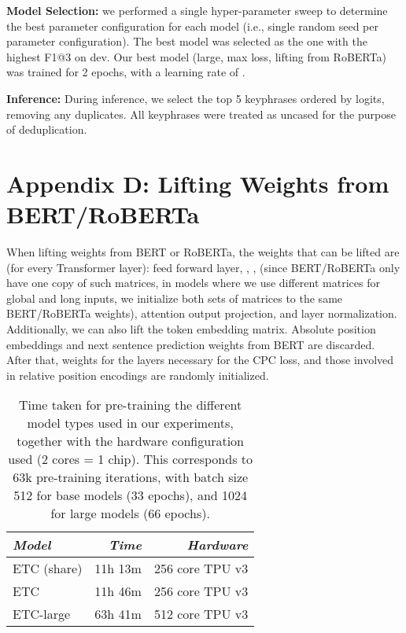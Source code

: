 \documentclass[11pt,a4paper]{article}
\begin{document}
{\bf Model Selection:} we performed a single hyper-parameter sweep to determine the best parameter configuration for each model (i.e., single random seed per parameter configuration). The best model was selected as the one with the highest F1@3 on dev. Our best model (large, max loss, lifting from RoBERTa) was trained for 2 epochs, with a learning rate of .

{\bf Inference:} During inference, we select the top 5 keyphrases ordered by logits, removing any duplicates. All keyphrases were treated as uncased for the purpose of deduplication.

\section*{Appendix D: Lifting Weights from BERT/RoBERTa} 



When lifting weights from BERT or RoBERTa, the weights that can be lifted are (for every Transformer layer): feed forward layer, , ,  (since BERT/RoBERTa only have one copy of such matrices, in models where we use different matrices for global and long inputs, we initialize both sets of matrices to the same BERT/RoBERTa weights), attention output projection, and layer normalization. Additionally, we can also lift the token embedding matrix. Absolute position embeddings and next sentence prediction weights from BERT are discarded. After that, weights for the layers necessary for the CPC loss, and those involved in relative position encodings are randomly initialized.


\begin{table}[tb]\centering 
\begin{tabular}{lrr} 
{\em Model} & {\em Time} & {\em Hardware}   \\ \hline
ETC (share) & 11h 13m   & 256 core TPU v3 \\
ETC         & 11h 46m   & 256 core TPU v3 \\
ETC-large   & 63h 41m   & 512 core TPU v3 \\
\end{tabular}							
\caption{Time taken for pre-training the different model types used in our experiments, together with the hardware configuration used (2 cores = 1 chip). This corresponds to 63k pre-training iterations, with batch size 512 for base models (33 epochs), and 1024 for large models (66 epochs).}
\label{tbl:times} 
\end{table}
\end{document}
